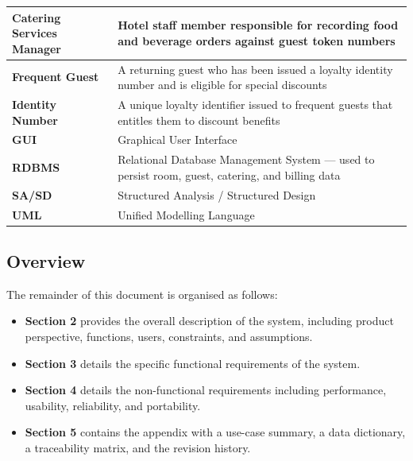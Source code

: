 \documentclass[12pt,a4paper]{article}
\begin{document}
\begin{longtable}{|L{3.5cm}|L{10cm}|}
  \hline
  \textbf{Catering Services Manager} & Hotel staff member responsible for recording food and beverage orders against guest token numbers \\
  \hline
  \textbf{Frequent Guest}           & A returning guest who has been issued a loyalty identity number and is eligible for special discounts \\
  \hline
  \textbf{Identity Number}          & A unique loyalty identifier issued to frequent guests that entitles them to discount benefits \\
  \hline
  \textbf{GUI}                      & Graphical User Interface \\
  \hline
  \textbf{RDBMS}                    & Relational Database Management System --- used to persist room, guest, catering, and billing data \\
  \hline
  \textbf{SA/SD}                    & Structured Analysis / Structured Design \\
  \hline
  \textbf{UML}                      & Unified Modelling Language \\
  \hline
\end{longtable}

\subsection{Overview}

The remainder of this document is organised as follows:

\begin{itemize}[leftmargin=1.5em]
  \item \textbf{Section 2} provides the overall description of the system, including product
        perspective, functions, users, constraints, and assumptions.
  \item \textbf{Section 3} details the specific functional requirements of the system.
  \item \textbf{Section 4} details the non-functional requirements including performance,
        usability, reliability, and portability.
  \item \textbf{Section 5} contains the appendix with a use-case summary, a data
        dictionary, a traceability matrix, and the revision history.
\end{itemize}

\newpage

\end{document}

